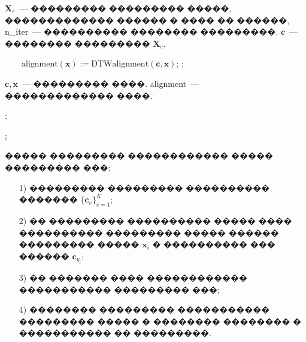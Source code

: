 \documentclass[12pt,twoside, notitlepage]{article}
\newcommand{\vkKw}[1]{{\bf\color{KwColor} #1}}
\newcommand{\vkProcedure}[1]{\text{#1}\:}
\newcommand{\PROCEDURE}[1]{\medskip\STATEx\vkKw{���������} \vkProcedure{#1}}
\begin{document}
\begin{algorithm}[h]
\caption{���������� ��������� $\text{DBA}(\mathbf{X}_e, \text{n\_iter})$}
\label{DBA_pseudo}
\begin{algorithmic}[1]
\REQUIRE $\mathbf{X}_e$~--- ��������� ��������� �����, ������������� ������ � ���� �� ������, n\_iter~--- ���������� �������� ���������.
\ENSURE $\mathbf{c}$~--- �������� ��������� $\mathbf{X}_e$.

        \STATEx $ \quad \quad \text{alignment}(\mathbf{x}) := \text{DTWalignment}(\mathbf{c}, \mathbf{x})$;
    \ENDFOR
    ;
\ENDFOR
\end{algorithmic}

\begin{algorithmic}[1]
\PROCEDURE {$\text{DTWalignment}(\mathbf{c}, \mathbf{x})$}
\REQUIRE $\mathbf{c}, \mathbf{x}$~--- ��������� ����.
\ENSURE alignment~--- ������������� ����.

;

;
\end{algorithmic}
\end{algorithm}
\newpage
����� ��������� ������������ ����� ��������� ���:
\begin{itemize}
    \item[1)]
    ��������� ��������� ���������� ������� $\{\mathbf{c}_e\}_{e = 1}^K$;
    \item[2)]
    �� ��������� ���������� ����� ���� ���������� ��������� ����� ������
    ��������� ����� $\mathbf{x}_i$ � ���������� ��� ������ $\mathbf{c}_{y_i}$;
    \item[3)]
    �� ������� ���� ������������ ����������� ��������� ���;
    \item[4)]
    �������� ��������� ����������� ��������� ����� � �������� �������� � ����������� �� ���������.
\end{itemize}
\end{document}
